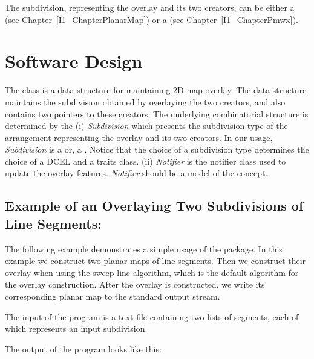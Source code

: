 \begin{ccTexOnly}

The subdivision, representing the overlay and its two creators, 
can be either a  
(see Chapter~\ref{I1_ChapterPlanarMap}) 
or a  
(see Chapter~\ref{I1_ChapterPmwx}).

\section{Software Design}
The  class 
is a data structure for maintaining 2D map overlay.
The data structure maintains the subdivision obtained by overlaying 
the two creators,
and also contains two pointers to these creators. 
The underlying combinatorial structure is determined by the
(i) {\it Subdivision} which presents the subdivision type of the arrangement 
representing the overlay and its two creators. 
In our usage, {\it Subdivision} is a  or, 
a .
Notice that the choice of a subdivision type determines the choice 
of a DCEL and a traits class.
(ii) {\it Notifier} is the notifier class used to update the overlay features. 
{\it Notifier} should be a model of the 
 concept.

\subsection*{Example of an Overlaying Two Subdivisions of Line Segments:}
The following example demonstrates a simple usage of the 
 package.
In this example we construct two planar maps of line segments. 
Then we construct their overlay when using the sweep-line algorithm, which is 
the default algorithm for the overlay construction. 
After the overlay is constructed, we write its corresponding planar map to the 
standard output stream. 

The input of the program is a text file containing two lists of segments, 
each of which represents an input subdivision.

The output of the program looks like this:


\end{ccTexOnly}

